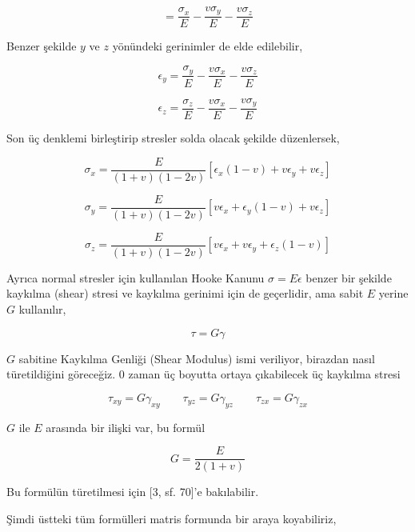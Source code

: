 \documentclass[12pt,fleqn]{article}\usepackage{../../common}
\begin{document}
$$
= \frac{\sigma_x}{E} - \frac{v \sigma_y}{E} - \frac{v \sigma_z}{E} 
$$

Benzer şekilde $y$ ve $z$ yönündeki gerinimler de elde edilebilir,

$$
\epsilon_y = \frac{\sigma_y}{E} - \frac{v \sigma_x}{E} - \frac{v \sigma_z}{E} 
$$

$$
\epsilon_z = \frac{\sigma_z}{E} - \frac{v \sigma_x}{E} - \frac{v \sigma_y}{E} 
$$

Son üç denklemi birleştirip stresler solda olacak şekilde düzenlersek,

$$
\sigma_x = \frac{E}{(1+v)(1-2v)} [\epsilon_x (1-v) + v \epsilon_y + v \epsilon_z ]
$$

$$
\sigma_y = \frac{E}{(1+v)(1-2v)} [ v \epsilon_x + \epsilon_y (1-v) + v \epsilon_z  ]
$$

$$
\sigma_z = \frac{E}{(1+v)(1-2v)} [v \epsilon_x + v \epsilon_y + \epsilon_z (1-v)  ]
$$

Ayrıca normal stresler için kullanılan Hooke Kanunu $\sigma = E \epsilon$ benzer
bir şekilde kaykılma (shear) stresi ve kaykılma gerinimi için de geçerlidir, ama
sabit $E$ yerine $G$ kullanılır,

$$
\tau = G \gamma
$$

$G$ sabitine Kaykılma Genliği (Shear Modulus) ismi veriliyor, birazdan nasıl
türetildiğini göreceğiz. 0 zaman üç boyutta ortaya çıkabilecek üç kaykılma
stresi

$$
\tau_{xy} = G \gamma_{xy} \qquad 
\tau_{yz} = G \gamma_{yz} \qquad 
\tau_{zx} = G \gamma_{zx}
$$

$G$ ile $E$ arasında bir ilişki var, bu formül

$$
G = \frac{E}{2(1+v)}
$$

Bu formülün türetilmesi için [3, sf. 70]'e bakılabilir.

Şimdi üstteki tüm formülleri matris formunda bir araya koyabiliriz,
\end{document}

